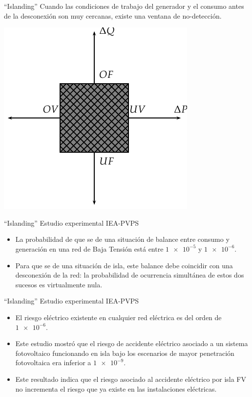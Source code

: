 \documentclass[xcolor={usenames,svgnames,dvipsnames}]{beamer}
\begin{document}
\begin{frame}[label=sec-2-0-22]{``Islanding''}
Cuando las condiciones de trabajo del generador y el consumo antes de la
desconexión son muy cercanas, existe una ventana de no-detección.

\includegraphics[width=.9\linewidth]{../figs/NDZ.pdf}
\end{frame}

\begin{frame}[label=sec-2-0-23]{``Islanding''}
Estudio experimental IEA-PVPS

\begin{itemize}
\item La probabilidad de que se de una situación de balance entre consumo y
generación en una red de Baja Tensión está entre $\num{1e-5}$ y
$\num{1e-6}$.

\item Para que se de una situación de isla, este balance debe coincidir con
una desconexión de la red: la probabilidad de ocurrencia simultánea
de estos dos sucesos es virtualmente nula.
\end{itemize}
\end{frame}

\begin{frame}[label=sec-2-0-24]{``Islanding''}
Estudio experimental IEA-PVPS

\begin{itemize}
\item El riesgo eléctrico existente en cualquier red eléctrica es del orden
de $\num{1e-6}$.

\item Este estudio mostró que el riesgo de accidente eléctrico asociado a
un sistema fotovoltaico funcionando en isla bajo los escenarios de
mayor penetración fotovoltaica era inferior a $\num{1e-9}$.

\item Este resultado indica que el riesgo asociado al accidente eléctrico
por isla FV no incrementa el riesgo que ya existe en las
instalaciones eléctricas.
\end{itemize}
\end{frame}
\end{document}
